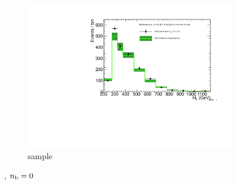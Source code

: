 \begin{figure}[h!]
\begin{subfigure}[b]{0.48\textwidth}
    \includegraphics[width=\textwidth,page=6]
    {Figs/results/v0/greenBand/bestFit_2012dev_RQcdZero_fZinvAll_0b_ge4j-12p_smOnly}
    \caption{\gj sample}
  \end{subfigure}
  \caption{\njhigh, $n_{\text{b}} = 0$}
  \label{fig:green_fits_0b_ge4j}
\end{figure}

